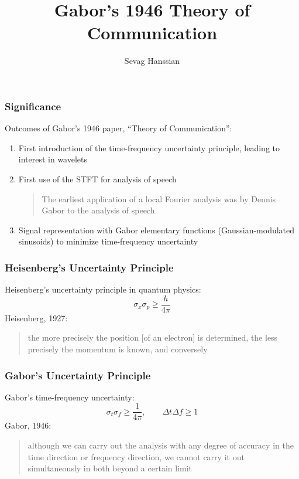 \documentclass{beamer}
\title{Gabor's 1946 Theory of Communication}
\author{Sevag Hanssian}
\institute{MUMT 622, Winter 2021}
\begin{document}
\begin{frame}
\maketitle
\end{frame}

\begin{frame}
	\frametitle{Significance}
	Outcomes of Gabor's 1946 paper, ``Theory of Communication'':
	\vspace{0.5em}
	\begin{enumerate}
		\item
			First introduction of the time-frequency uncertainty principle, leading to interest in wavelets
		\item
			First use of the STFT for analysis of speech
			\begin{quote}
			The earliest application of a local Fourier analysis was by Dennis Gabor to the analysis of speech
			\end{quote}
		\item
			\vspace{-0.35em}
			Signal representation with Gabor elementary functions (Gaussian-modulated sinusoids) to minimize time-frequency uncertainty
	\end{enumerate}
\end{frame}

\begin{frame}
	\frametitle{Heisenberg's Uncertainty Principle}
	Heisenberg's uncertainty principle in quantum physics:
	    \[ \sigma_{x}\sigma_{p} \ge \frac{h}{4\pi} \]
	    Heisenberg, 1927:
	    \begin{quote}
		    the more precisely the position [of an electron] is determined, the less precisely the momentum is known, and conversely
	    \end{quote}
\end{frame}


\begin{frame}
	\frametitle{Gabor's Uncertainty Principle}
	Gabor's time-frequency uncertainty:
	    \[ \sigma_{t}\sigma_{f} \ge \frac{1}{4\pi},\qquad\Delta t\Delta f \ge 1 \]
	    Gabor, 1946:
	    \begin{quote}
		    although we can carry out the analysis with any degree of accuracy in the time direction or frequency direction, we cannot carry it out simultaneously in both beyond a certain limit
	    \end{quote}
\end{frame}
\end{document}
